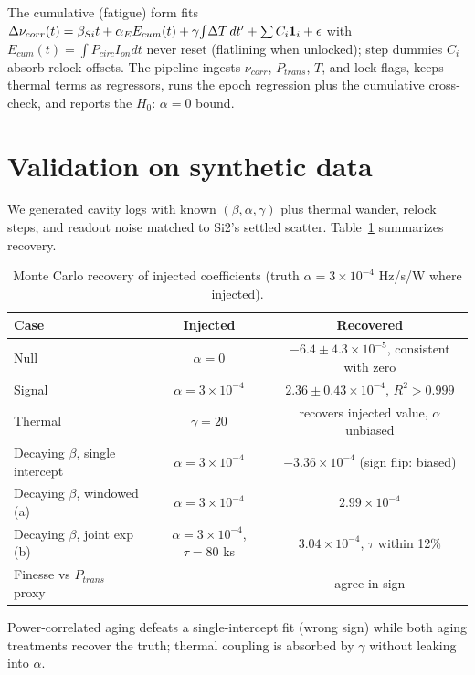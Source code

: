 \documentclass[11pt, a4paper]{article}
\begin{document}
The cumulative (fatigue) form fits $\Delta\nu_{corr}(t)=\beta_{Si}t+\alpha_E E_{cum}(t)+\gamma\!\int\!\Delta T\,dt'+\sum C_i{\bf1}_i+\epsilon$ with $E_{cum}(t)=\int P_{circ}I_{on}dt$ never reset (flatlining when unlocked); step dummies $C_i$ absorb relock offsets. The pipeline ingests $\nu_{corr}$, $P_{trans}$, $T$, and lock flags, keeps thermal terms as regressors, runs the epoch regression plus the cumulative cross-check, and reports the $H_0$: $\alpha=0$ bound.

\section{Validation on synthetic data}
We generated cavity logs with known $(\beta,\alpha,\gamma)$ plus thermal wander, relock steps, and readout noise matched to Si2's settled scatter. Table~\ref{tab:mc} summarizes recovery.

\begin{table}[h]
\centering
\caption{Monte Carlo recovery of injected coefficients (truth $\alpha=3\times10^{-4}$ Hz/s/W where injected).}
\label{tab:mc}
\begin{tabular}{@{}lcc@{}}
\toprule
Case & Injected & Recovered \\
\midrule
Null & $\alpha=0$ & $-6.4\pm4.3\times10^{-5}$, consistent with zero \\
Signal & $\alpha=3\times10^{-4}$ & $2.36\pm0.43\times10^{-4}$, $R^2>0.999$ \\
Thermal & $\gamma=20$ & recovers injected value, $\alpha$ unbiased \\
Decaying $\beta$, single intercept & $\alpha=3\times10^{-4}$ & $-3.36\times10^{-4}$ (sign flip: biased) \\
Decaying $\beta$, windowed (a) & $\alpha=3\times10^{-4}$ & $2.99\times10^{-4}$ \\
Decaying $\beta$, joint exp (b) & $\alpha=3\times10^{-4}$, $\tau=80$ ks & $3.04\times10^{-4}$, $\tau$ within 12\% \\
Finesse vs $P_{trans}$ proxy & --- & agree in sign \\
\bottomrule
\end{tabular}
\end{table}

Power-correlated aging defeats a single-intercept fit (wrong sign) while both aging treatments recover the truth; thermal coupling is absorbed by $\gamma$ without leaking into $\alpha$.
\end{document}
